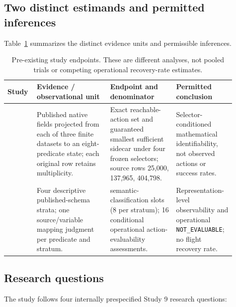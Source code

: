 \documentclass[preprint,12pt]{elsarticle}
\begin{document}
\subsection{Two distinct estimands and permitted inferences}
Table~\ref{tab:estimands} summarizes the distinct evidence units and permissible inferences.
\begin{table}[H]
\centering
\small
\caption{Pre-existing study endpoints. These are different analyses, not pooled trials or competing operational recovery-rate estimates.}
\label{tab:estimands}
\setlength{\tabcolsep}{2pt}
\begin{tabular}{>{\raggedright\arraybackslash}p{0.10\linewidth}>{\raggedright\arraybackslash}p{0.30\linewidth}>{\raggedright\arraybackslash}p{0.27\linewidth}>{\raggedright\arraybackslash}p{0.24\linewidth}}
\toprule
Study & Evidence / observational unit & Endpoint and denominator & Permitted conclusion \\
\midrule
9 & Published native fields projected from each of three finite datasets to an eight-predicate state; each original row retains multiplicity. & Exact reachable-action set and guaranteed smallest sufficient sidecar under four frozen selectors; source rows 25,000, 137,965, 404,798. & Selector-conditioned mathematical identifiability, not observed actions or success rates. \\
10 & Four descriptive published-schema strata; one source/variable mapping judgment per predicate and stratum. & 32 semantic-classification slots (8 per stratum); 16 conditional operational action-evaluability assessments. & Representation-level observability and operational \texttt{NOT\_EVALUABLE}; no flight recovery rate. \\
\bottomrule
\end{tabular}
\end{table}

\subsection{Research questions}

The study follows four internally prespecified Study 9 research questions:
\end{document}
